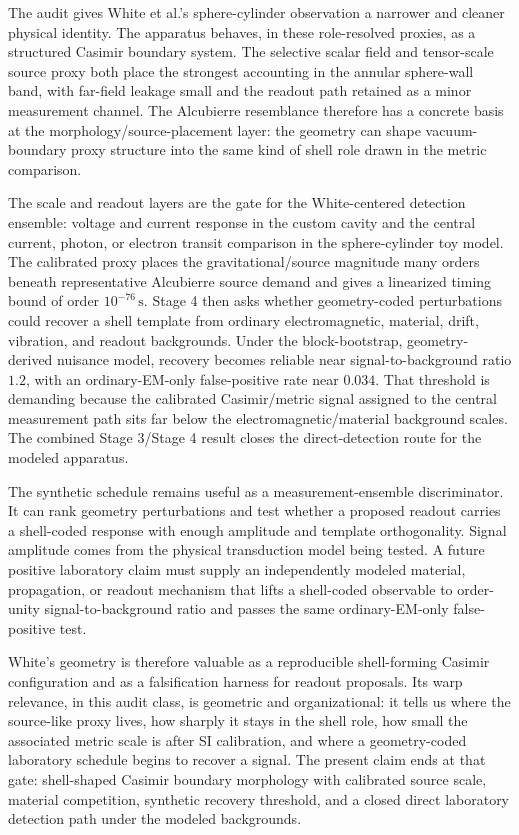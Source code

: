 \documentclass[11pt]{article}
\begin{document}
The audit gives White et al.'s sphere-cylinder observation a narrower and
cleaner physical identity. The apparatus behaves, in these role-resolved
proxies, as a structured Casimir boundary system. The selective scalar field
and tensor-scale source proxy both place the strongest accounting in the
annular sphere-wall band, with far-field leakage small and the readout path
retained as a minor measurement channel. The Alcubierre resemblance therefore
has a concrete basis at the morphology/source-placement layer: the geometry can
shape vacuum-boundary proxy structure into the same kind of shell role drawn in
the metric comparison.

The scale and readout layers are the gate for the White-centered detection
ensemble: voltage and current response in the custom cavity and the central
current, photon, or electron transit comparison in the sphere-cylinder toy
model.
The calibrated proxy places the gravitational/source magnitude many orders
beneath representative Alcubierre source demand and gives a linearized timing
bound of order $10^{-76}\,\mathrm{s}$. Stage 4 then asks whether
geometry-coded perturbations could recover a shell template from ordinary
electromagnetic, material, drift, vibration, and readout backgrounds. Under
the block-bootstrap, geometry-derived nuisance model, recovery becomes
reliable near signal-to-background ratio $1.2$, with an ordinary-EM-only
false-positive rate near $0.034$. That threshold is demanding because the
calibrated Casimir/metric signal assigned to the central measurement path sits
far below the electromagnetic/material background scales. The combined Stage
3/Stage 4 result closes the direct-detection route for the modeled apparatus.

The synthetic schedule remains useful as a measurement-ensemble discriminator.
It can rank geometry perturbations and test whether a proposed readout carries
a shell-coded response with enough amplitude and template orthogonality.
Signal amplitude comes from the physical transduction model being tested. A
future positive laboratory claim must supply an independently modeled
material, propagation, or readout mechanism that lifts a shell-coded observable
to order-unity signal-to-background ratio and passes the same ordinary-EM-only
false-positive test.

White's geometry is therefore valuable as a reproducible shell-forming Casimir
configuration and as a falsification harness for readout proposals. Its warp
relevance, in this audit class, is geometric and organizational: it tells us
where the source-like proxy lives, how sharply it stays in the shell role, how
small the associated metric scale is after SI calibration, and where a
geometry-coded laboratory schedule begins to recover a signal. The present
claim ends at that gate: shell-shaped Casimir boundary morphology with
calibrated source scale, material competition, synthetic recovery threshold,
and a closed direct laboratory detection path under the modeled backgrounds.
\end{document}
